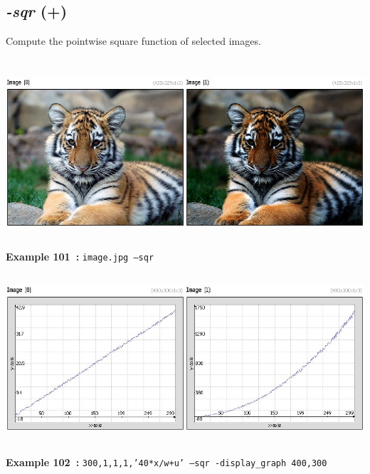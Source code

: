 \documentclass[a4paper,11pt,twoside]{book}
\begin{document}
\subsection{\emph{-sqr} (+)}\vspace*{-0.5em}
Compute the pointwise square function of selected images.
\begin{center}\includegraphics[keepaspectratio=true,height=7cm,width=\textwidth]{img/gmic_def101.jpg}\\
{\footnotesize \textbf{Example 101~:} \texttt{image.jpg --sqr}}
\\\includegraphics[keepaspectratio=true,height=7cm,width=\textwidth]{img/gmic_def102.jpg}\\
{\footnotesize \textbf{Example 102~:} \texttt{300,1,1,1,'40*x/w+u' --sqr -display\_graph 400,300}}
\end{center}
\end{document}
